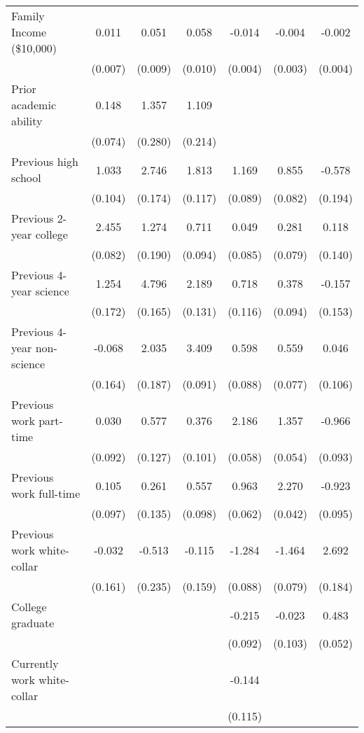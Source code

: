 \begin{table}[ht]
{\begin{threeparttable}
\begin{tabular}{lcccccc}
Family Income (\$10,000) &   0.011 &   0.051 &   0.058 &  -0.014 &  -0.004 &  -0.002 \\ 
 & (0.007) & (0.009) & (0.010) & (0.004) & (0.003) & (0.004) \\ 
Prior academic ability &   0.148 &   1.357 &   1.109 &   &   &   \\ 
 & (0.074) & (0.280) & (0.214) &  &  &  \\ 
Previous high school &   1.033 &   2.746 &   1.813 &   1.169 &   0.855 &  -0.578 \\ 
 & (0.104) & (0.174) & (0.117) & (0.089) & (0.082) & (0.194) \\ 
Previous 2-year college &   2.455 &   1.274 &   0.711 &   0.049 &   0.281 &   0.118 \\ 
 & (0.082) & (0.190) & (0.094) & (0.085) & (0.079) & (0.140) \\ 
Previous 4-year science &   1.254 &   4.796 &   2.189 &   0.718 &   0.378 &  -0.157 \\ 
 & (0.172) & (0.165) & (0.131) & (0.116) & (0.094) & (0.153) \\ 
Previous 4-year non-science &  -0.068 &   2.035 &   3.409 &   0.598 &   0.559 &   0.046 \\ 
 & (0.164) & (0.187) & (0.091) & (0.088) & (0.077) & (0.106) \\ 
Previous work part-time &   0.030 &   0.577 &   0.376 &   2.186 &   1.357 &  -0.966 \\ 
 & (0.092) & (0.127) & (0.101) & (0.058) & (0.054) & (0.093) \\ 
Previous work full-time &   0.105 &   0.261 &   0.557 &   0.963 &   2.270 &  -0.923 \\ 
 & (0.097) & (0.135) & (0.098) & (0.062) & (0.042) & (0.095) \\ 
Previous work white-collar &  -0.032 &  -0.513 &  -0.115 &  -1.284 &  -1.464 &   2.692 \\ 
 & (0.161) & (0.235) & (0.159) & (0.088) & (0.079) & (0.184) \\ 
College graduate &   &   &   &  -0.215 &  -0.023 &   0.483 \\ 
 &  &  &  & (0.092) & (0.103) & (0.052) \\ 
Currently work white-collar &   &   &   &  -0.144 &   &   \\ 
 &  &  &  & (0.115) &  &  \\ 

\end{tabular}
\end{threeparttable}}
\end{table}
